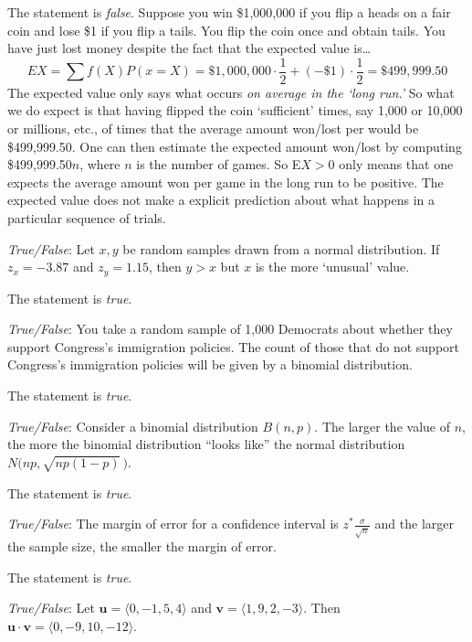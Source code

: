 \documentclass[11pt,letterpaper]{article}
\begin{document}
\sol The statement is \textit{false}. Suppose you win \$1,000,000 if you flip a heads on a fair coin and lose \$1 if you flip a tails. You flip the coin once and obtain tails. You have just lost money despite the fact that the expected value is\dots
	\[
	EX= \sum f(X) P(x= X)= \$1,\!000,\!000 \cdot \dfrac{1}{2} + (-\$1) \cdot \dfrac{1}{2}= \$499,\!999.50
	\]
The expected value only says what occurs \textit{on average in the `long run.'} So what we do expect is that having flipped the coin `sufficient' times, say 1,000 or 10,000 or millions, etc., of times that the average amount won/lost per would be \$499,999.50. One can then estimate the expected amount won/lost by computing \$499,999.50$n$, where $n$ is the number of games. So E$X > 0$ only means that one expects the average amount won per game in the long run to be positive. The expected value does not make a explicit prediction about what happens in a particular sequence of trials. \pvspace{1.3cm}



\quizsol \textit{True/False}: Let $x, y$ be random samples drawn from a normal distribution. If $z_x= -3.87$ and $z_y= 1.15$, then $y > x$ but $x$ is the more `unusual' value. \pspace

\sol The statement is \textit{true}. 


\quizsol \textit{True/False}: You take a random sample of 1,000 Democrats about whether they support Congress's immigration policies. The count of those that do not support Congress's immigration policies will be given by a binomial distribution. \pspace

\sol The statement is \textit{true}. 

\quizsol \textit{True/False}: Consider a binomial distribution $B(n, p)$. The larger the value of $n$, the more the binomial distribution ``looks like'' the normal distribution $N\big(np, \sqrt{np(1 - p)}\, \big)$. \pspace

\sol The statement is \textit{true}. 


\quizsol \textit{True/False}: The margin of error for a confidence interval is $z^* \frac{\sigma}{\sqrt{n}}$ and the larger the sample size, the smaller the margin of error. \pspace

\sol The statement is \textit{true}. 


\quizsol \textit{True/False}: Let $\mathbf{u}= \langle 0, -1, 5, 4 \rangle$ and $\mathbf{v}= \langle 1, 9, 2, -3 \rangle$. Then $\mathbf{u} \cdot \mathbf{v}= \langle 0, -9, 10, -12 \rangle$. \pspace
\end{document}
